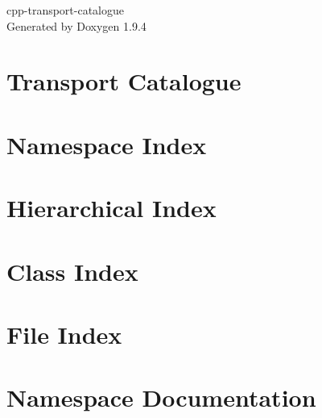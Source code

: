 \documentclass[twoside]{book}
\newcommand{\+}{\discretionary{\mbox{\scriptsize$\hookleftarrow$}}{}{}}
\newcommand{\clearemptydoublepage}{%
    \newpage{\pagestyle{empty}\cleardoublepage}%
  }
\begin{document}
  \raggedbottom
    \hypersetup{pageanchor=false,
                bookmarksnumbered=true,
                pdfencoding=unicode
               }
  \begin{titlepage}
  \vspace*{7cm}
  \begin{center}%
  {\Large cpp-\/transport-\/catalogue}\\
  \vspace*{1cm}
  {\large Generated by Doxygen 1.9.4}\\
  \end{center}
  \end{titlepage}
  \clearemptydoublepage
  \tableofcontents
  \clearemptydoublepage
  \hypersetup{pageanchor=true}
\chapter{Transport Catalogue}
\label{index}\hypertarget{index}{}
\chapter{Namespace Index}

\chapter{Hierarchical Index}

\chapter{Class Index}

\chapter{File Index}

\chapter{Namespace Documentation}





\end{document}
